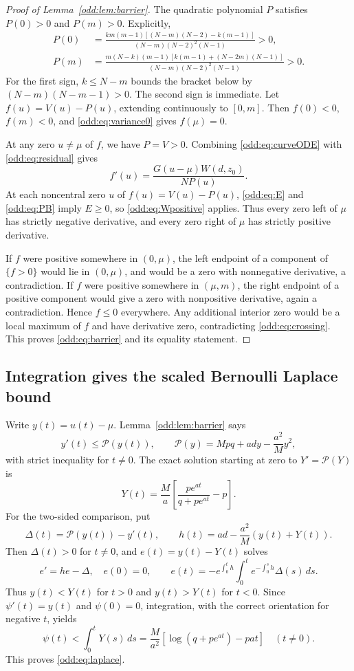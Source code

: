 \documentclass[11pt,a4paper]{article}
\begin{document}
\begin{proof}[Proof of Lemma~\ref{odd:lem:barrier}]
The quadratic polynomial $P$ satisfies $P(0)>0$ and $P(m)>0$. Explicitly,
\begin{align}
 P(0)&=\frac{km(m-1)[(N-m)(N-2)-k(m-1)]}
 {(N-m)(N-2)^2(N-1)}>0,\label{odd:eq:end0}\\
 P(m)&=\frac{m(N-k)(m-1)[k(m-1)+(N-2m)(N-1)]}
 {(N-m)(N-2)^2(N-1)}>0.\label{odd:eq:endm}
\end{align}
For the first sign, $k\le N-m$ bounds the bracket below by
$(N-m)(N-m-1)>0$. The second sign is immediate.
Let $f(u)=V(u)-P(u)$, extending continuously to $[0,m]$.
Then $f(0)<0$, $f(m)<0$, and \eqref{odd:eq:variance0} gives $f(\mu)=0$.

At any zero $u\ne\mu$ of $f$, we have $P=V>0$. Combining
\eqref{odd:eq:curveODE} with \eqref{odd:eq:residual} gives
\begin{equation}\label{odd:eq:crossing}
 f'(u)=\frac{G(u-\mu)W(d,z_0)}{NP(u)}.
\end{equation}
At each noncentral zero $u$ of $f(u)=V(u)-P(u)$, \eqref{odd:eq:E} and \eqref{odd:eq:PB} imply $E\ge0$, so
\eqref{odd:eq:Wpositive} applies. Thus every zero left of $\mu$ has strictly negative derivative, and every zero right of $\mu$ has strictly positive derivative.

If $f$ were positive somewhere in $(0,\mu)$, the left endpoint of a component of $\{f>0\}$ would lie in $(0,\mu)$, and would be a zero with nonnegative derivative, a contradiction. If $f$ were positive somewhere in $(\mu,m)$, the right endpoint of a positive component would give a zero with nonpositive derivative, again a contradiction. Hence $f\le0$ everywhere. Any additional interior zero would be a local maximum of $f$ and have derivative zero, contradicting \eqref{odd:eq:crossing}. This proves \eqref{odd:eq:barrier} and its equality statement.
\end{proof}

\subsection{Integration gives the scaled Bernoulli Laplace bound}
Write $y(t)=u(t)-\mu$. Lemma~\ref{odd:lem:barrier} says
\[
 y'(t)\le \mathcal P(y(t)),\qquad
 \mathcal P(y)=Mpq+ady-\frac{a^2}{M}y^2,
\]
with strict inequality for $t\ne0$. The exact solution starting at zero to
$Y'=\mathcal P(Y)$ is
\begin{equation}\label{odd:eq:Y}
 Y(t)=\frac{M}{a}\left[\frac{pe^{at}}{q+pe^{at}}-p\right].
\end{equation}
For the two-sided comparison, put
\[
 \Delta(t)=\mathcal P(y(t))-y'(t),\qquad
 h(t)=ad-\frac{a^2}{M}(y(t)+Y(t)).
\]
Then $\Delta(t)>0$ for $t\ne0$, and $e(t)=y(t)-Y(t)$ solves
\[
 e'=he-\Delta,\quad e(0)=0,\qquad
 e(t)=-e^{\int_0^t h}\int_0^t e^{-\int_0^s h}\Delta(s)\,ds.
\]
Thus $y(t)<Y(t)$ for $t>0$ and $y(t)>Y(t)$ for $t<0$.
Since $\psi'(t)=y(t)$ and $\psi(0)=0$, integration, with the correct orientation for negative $t$, yields
\[
 \psi(t)<\int_0^tY(s)\,ds
 =\frac{M}{a^2}[\log(q+pe^{at})-pat]\quad(t\ne0).
\]
This proves \eqref{odd:eq:laplace}.
\end{document}
